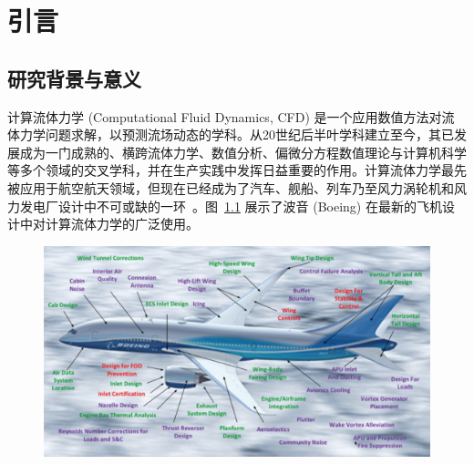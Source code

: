 \chapter{引言}
\label{chap:introduction}

\section{研究背景与意义}
\label{sec:background}
计算流体力学 (Computational Fluid Dynamics, CFD) 是一个应用数值方法对流体力学问题求解，以预测流场动态的学科。从20世纪后半叶学科建立至今，其已发展成为一门成熟的、横跨流体力学、数值分析、偏微分方程数值理论与计算机科学等多个领域的交叉学科，并在生产实践中发挥日益重要的作用。计算流体力学最先被应用于航空航天领域，但现在已经成为了汽车、舰船、列车乃至风力涡轮机和风力发电厂设计中不可或缺的一环~\citep{https://doi.org/10.1002/we.458}。图~\ref{img:cfd_impact_on_planes} 展示了波音 (Boeing) 在最新的飞机设计中对计算流体力学的广泛使用。

\begin{figure}[htbp]
    \centering
      \includegraphics[width=0.99\columnwidth]{figures/cfd_impact_on_planes.png}
    \label{img:cfd_impact_on_planes}
\end{figure}

